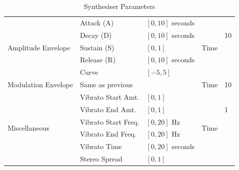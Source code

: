 \documentclass[11pt, oneside]{report}   	%
\begin{document}
\begin{table}[]
\begin{tabular}{|l|l|l|l|l|}
		\multirow{5}{*}{Amplitude Envelope}    & Attack (A)       				& $[0, 10]$ seconds        & \multirow{5}{*}{Time}& \multirow{3}{*}{10} \\
																	  & Decay (D)               		& $[0, 10]$ seconds         &                       			&\\
																	  & Sustain (S)             	 	 & $[0, 1]$                   		&                       			&\\
																	  & Release (R)             		& $[0, 10]$ seconds        &                       			&\\
																	  & Curve                   	   	   & $[-5, 5]$                  	&                       			&\\ \hline
		Modulation Envelope        						& Same as previous           &                            			& Time              	& 10									\\ \hline
		\multirow{6}{*}{Miscellaneous}             & Vibrato Start Amt.    		  & $[0, 1]$                   	& \multirow{6}{*}{Time}& \multirow{3}{*}{1} \\
																	  & Vibrato End Amt.	         & $[0, 1]$                   		&                       			&\\
																	  & Vibrato Start Freq.			  & $[0, 20]$ Hz               &                       			&\\
																	  & Vibrato End Freq.		      & $[0, 20]$ Hz               &                       			&\\
																	  & Vibrato Time            		& $[0, 20]$ seconds      &                       			&\\
																	  & Stereo Spread           	  & $[0, 1]$                   		&                       			&\\ \hline
	\end{tabular}
\caption{Synthesiser Parameters}
\label{tab:Params}
\end{table}
\end{document}
